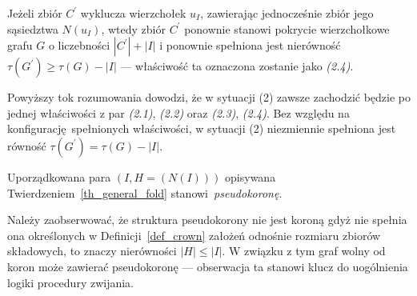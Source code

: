 {\begin{bproof}
\begin{itemize}
      Jeżeli zbiór $C^\prime$ wyklucza wierzchołek $u_I$, zawierając jednocześnie zbiór jego sąsiedztwa $N(u_I)$, wtedy zbiór $C^\prime$ ponownie stanowi pokrycie wierzchołkowe grafu $G$ o liczebności $|C^\prime|+|I|$ i ponownie spełniona jest nierówność $\tau(G^\prime)\geq \tau(G)-|I|$ --- właściwość ta oznaczona zostanie jako \textit{(2.4)}.

      Powyższy tok rozumowania dowodzi, że w sytuacji (2) zawsze zachodzić będzie po jednej właściwości z par \textit{(2.1)}, \textit{(2.2)} oraz \textit{(2.3)}, \textit{(2.4)}.
      Bez względu na konfigurację spełnionych właściwości, w sytuacji (2) niezmiennie spełniona jest równość $\tau(G^\prime)=\tau(G)-|I|$.
    \end{itemize}
  \end{bproof}

  \begin{definition}
    Uporządkowana para $(I, H=(N(I)))$ opisywana Twierdzeniem~\ref{th_general_fold} stanowi~\emph{pseudokoronę}.
  \end{definition}

  Należy zaobserwować, że struktura pseudokorony nie jest koroną gdyż nie spełnia ona określonych w Definicji~\ref{def_crown} założeń odnośnie rozmiaru zbiorów składowych, to znaczy nierówności $|H| \leq |I|$.
  W związku z tym graf wolny od koron może zawierać pseudokoronę --- obserwacja ta stanowi klucz do uogólnienia logiki procedury zwijania.
}
